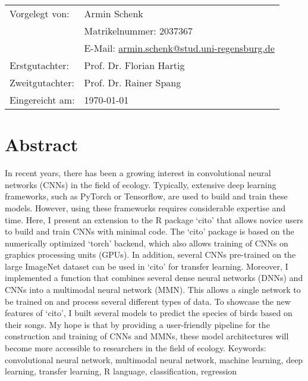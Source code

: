 \documentclass[12pt,twoside]{scrreport}
\newcommand{\pkg}[1]{`#1'}
\begin{document}
\begin{titlepage}
\begin{tabular}{ll}
Vorgelegt von: & Armin Schenk \\
& Matrikelnummer: 2037367 \\
& E-Mail: \url{armin.schenk@stud.uni-regensburg.de} \vspace{5mm}\\

Erstgutachter: & Prof. Dr. Florian Hartig\\
Zweitgutachter: & Prof. Dr. Rainer Spang \vspace{5mm}\\

Eingereicht am: & \today\\
\end{tabular}
\restoregeometry 
\end{titlepage}
\thispagestyle{empty}
\vspace*{\fill} %
\mbox{} %
\tableofcontents

\chapter*{Abstract}
\noindent In recent years, there has been a growing interest in convolutional neural networks (CNNs) in the field of ecology. Typically, extensive deep learning frameworks, such as PyTorch or Tensorflow, are used to build and train these models. However, using these frameworks requires considerable expertise and time. Here, I present an extension to the R package \pkg{cito} that allows novice users to build and train CNNs with minimal code. The \pkg{cito} package is based on the numerically optimized \pkg{torch} backend, which also allows training of CNNs on graphics processing units (GPUs). In addition, several CNNs pre-trained on the large ImageNet dataset can be used in \pkg{cito} for transfer learning. Moreover, I implemented a function that combines several dense neural networks (DNNs) and CNNs into a multimodal neural network (MMN). This allows a single network to be trained on and process several different types of data. To showcase the new features of \pkg{cito}, I built several models to predict the species of birds based on their songs. My hope is that by providing a user-friendly pipeline for the construction and training of CNNs and MMNs, these model architectures will become more accessible to researchers in the field of ecology.
\newline\newline
Keywords: convolutional neural network, multimodal neural network, machine learning, deep learning, transfer learning, R language, classification, regression
\end{document}
